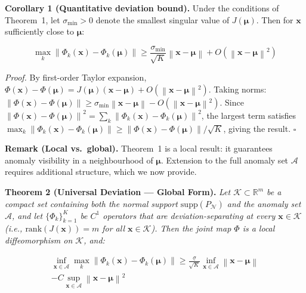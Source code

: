 \documentclass[journal]{IEEEtran}
\newcommand{\R}{\mathbb{R}}
\newcommand{\norm}[1]{\left\lVert#1\right\rVert}
\begin{document}
\vspace{0.5em}

\textbf{Corollary 1 (Quantitative deviation bound).} Under the conditions of Theorem~1, let $\sigma_{\min} > 0$ denote the smallest singular value of $J(\boldsymbol{\mu})$. Then for $\mathbf{x}$ sufficiently close to $\boldsymbol{\mu}$:

\begin{equation}
\max_{k} \norm{\Phi_k(\mathbf{x}) - \Phi_k(\boldsymbol{\mu})} \geq \frac{\sigma_{\min}}{\sqrt{K}} \norm{\mathbf{x} - \boldsymbol{\mu}} + O(\norm{\mathbf{x} - \boldsymbol{\mu}}^2)
\label{eq:quantitative}
\end{equation}

\textit{Proof.} By first-order Taylor expansion, $\Phi(\mathbf{x}) - \Phi(\boldsymbol{\mu}) = J(\boldsymbol{\mu})(\mathbf{x} - \boldsymbol{\mu}) + O(\norm{\mathbf{x}-\boldsymbol{\mu}}^2)$. Taking norms: $\norm{\Phi(\mathbf{x}) - \Phi(\boldsymbol{\mu})} \geq \sigma_{\min} \norm{\mathbf{x} - \boldsymbol{\mu}} - O(\norm{\mathbf{x}-\boldsymbol{\mu}}^2)$. Since $\norm{\Phi(\mathbf{x}) - \Phi(\boldsymbol{\mu})}^2 = \sum_k \norm{\Phi_k(\mathbf{x}) - \Phi_k(\boldsymbol{\mu})}^2$, the largest term satisfies $\max_k \norm{\Phi_k(\mathbf{x}) - \Phi_k(\boldsymbol{\mu})} \geq \norm{\Phi(\mathbf{x}) - \Phi(\boldsymbol{\mu})}/\sqrt{K}$, giving the result. $\square$

\textbf{Remark (Local vs.\ global).} Theorem~1 is a local result: it guarantees anomaly visibility in a neighbourhood of $\boldsymbol{\mu}$. Extension to the full anomaly set $\mathcal{A}$ requires additional structure, which we now provide.

\vspace{0.5em}

\textbf{Theorem 2 (Universal Deviation --- Global Form).} \textit{Let $\mathcal{K} \subset \R^m$ be a compact set containing both the normal support $\text{supp}(P_{\mathcal{N}})$ and the anomaly set $\mathcal{A}$, and let $\{\Phi_k\}_{k=1}^K$ be $C^1$ operators that are deviation-separating at every $\mathbf{x} \in \mathcal{K}$ (i.e., $\text{rank}(J(\mathbf{x})) = m$ for all $\mathbf{x} \in \mathcal{K}$). Then the joint map $\Phi$ is a local diffeomorphism on $\mathcal{K}$, and:}

\begin{multline}
\inf_{\mathbf{x} \in \mathcal{A}} \max_{k} \norm{\Phi_k(\mathbf{x}) - \Phi_k(\boldsymbol{\mu})}
  \geq \frac{\underline{\sigma}}{\sqrt{K}} \inf_{\mathbf{x} \in \mathcal{A}} \norm{\mathbf{x} - \boldsymbol{\mu}} \\
  - C \sup_{\mathbf{x} \in \mathcal{A}} \norm{\mathbf{x} - \boldsymbol{\mu}}^2
\label{eq:global}
\end{multline}
\end{document}
